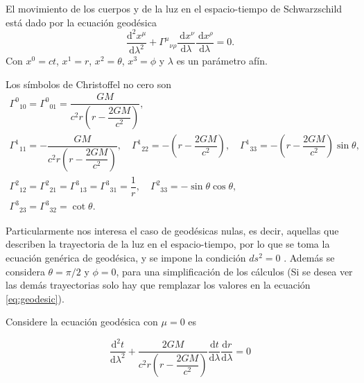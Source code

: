 \noindent El movimiento de los cuerpos y de la luz en el espacio-tiempo de Schwarzschild está dado por la ecuación geodésica
\begin{equation}
    \frac{\mathrm{d}^2 x^\mu}{\mathrm{d} \lambda^2}+\Gamma^\mu{ }_{\nu \rho} \frac{\mathrm{~d} x^\nu}{\mathrm{d} \lambda} \frac{\mathrm{~d} x^\rho}{\mathrm{d} \lambda}=0.
    \label{eq:geodesic}
\end{equation}
Con $x^0 = ct$, $x^1 = r$, $x^2 = \theta$, $x^3 = \phi$ y $\lambda$ es un parámetro afín.

Los símbolos de Christoffel no cero son
\begin{equation}
        \begin{array}{l}
        \Gamma^0{ }_{10}=\Gamma^0{ }_{01}=\dfrac{G M}{c^2 r\left(r - \dfrac{2 G M}{c^2}\right)},                                                                                                                       \\
        \Gamma^1{ }_{11}=-\dfrac{G M}{c^2 r\left(r - \dfrac{2 G M}{c^2}\right)}, \quad \Gamma^1{ }_{22}=-\left(r - \dfrac{2 G M}{c^2}\right), \quad \Gamma^1{ }_{33}=-\left(r - \dfrac{2 G M}{c^2}\right) \sin \theta, \\
        \Gamma^2{ }_{12}=\Gamma^2{ }_{21}=\Gamma^3{ }_{13}=\Gamma^3{ }_{31}=\dfrac{1}{r}, \quad \Gamma^2{ }_{33}=-\sin \theta \cos \theta,                                                                             \\
        \Gamma^3{ }_{23}=\Gamma^3{ }_{32}=\cot \theta.
    \end{array}
\end{equation}

Particularmente nos interesa el caso de geodésicas nulas, es decir, aquellas que describen la trayectoria de la luz en el espacio-tiempo, por lo que se toma la ecuación genérica de geodésica, y se impone la condición $ds^2 = 0$  . Además se considera $\theta=\pi/2$ y $\phi=0$, para una simplificación de los cálculos  (Si se desea ver las demás trayectorias solo hay que remplazar los valores en la ecuación \ref{eq:geodesic}).

Considere  la ecuación geodésica con $\mu=0$ es

\begin{equation}    
    \frac{\mathrm{d}^2 t}{\mathrm{d} \lambda^2}+\dfrac{2 G M}{c^2 r\left(r - \dfrac{2 G M}{c^2}\right)} \frac{\mathrm{d} t}{\mathrm{d} \lambda} \frac{\mathrm{d} r}{\mathrm{d} \lambda}=0
\end{equation}

